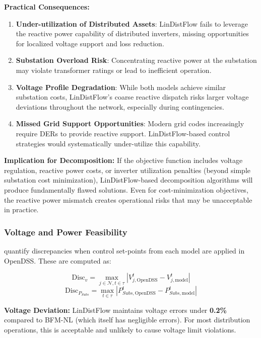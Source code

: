 \textbf{Practical Consequences:}
\begin{enumerate}
    \item \textbf{Under-utilization of Distributed Assets}: LinDistFlow fails to leverage the reactive power capability of distributed inverters, missing opportunities for localized voltage support and loss reduction.
    
    \item \textbf{Substation Overload Risk}: Concentrating reactive power at the substation may violate transformer ratings or lead to inefficient operation.
    
    \item \textbf{Voltage Profile Degradation}: While both models achieve similar substation costs, LinDistFlow's coarse reactive dispatch risks larger voltage deviations throughout the network, especially during contingencies.
    
    \item \textbf{Missed Grid Support Opportunities}: Modern grid codes increasingly require DERs to provide reactive support. LinDistFlow-based control strategies would systematically under-utilize this capability.
\end{enumerate}

\textbf{Implication for Decomposition:} If the objective function includes voltage regulation, reactive power costs, or inverter utilization penalties (beyond simple substation cost minimization), LinDistFlow-based decomposition algorithms will produce fundamentally flawed solutions. Even for cost-minimization objectives, the reactive power mismatch creates operational risks that may be unacceptable in practice.

\subsubsection{Voltage and Power Feasibility}

 quantify discrepancies when control set-points from each model are applied in OpenDSS. These are computed as:

\[
\text{Disc}_v = \max_{j \in \mathcal{N}, t \in \tau} |V^t_{j,\text{OpenDSS}} - V^t_{j,\text{model}}|
\]
\[
\text{Disc}_{P_{Subs}} = \max_{t \in \tau} |P^t_{Subs,\text{OpenDSS}} - P^t_{Subs,\text{model}}|
\]

\textbf{Voltage Deviation:} LinDistFlow maintains voltage errors under \textbf{0.2\%} compared to BFM-NL (which itself has negligible errors). For most distribution operations, this is acceptable and unlikely to cause voltage limit violations.

